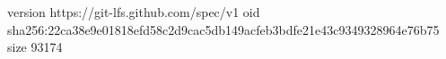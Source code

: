 version https://git-lfs.github.com/spec/v1
oid sha256:22ca38e9e01818efd58c2d9cac5db149acfeb3bdfe21e43c9349328964e76b75
size 93174
